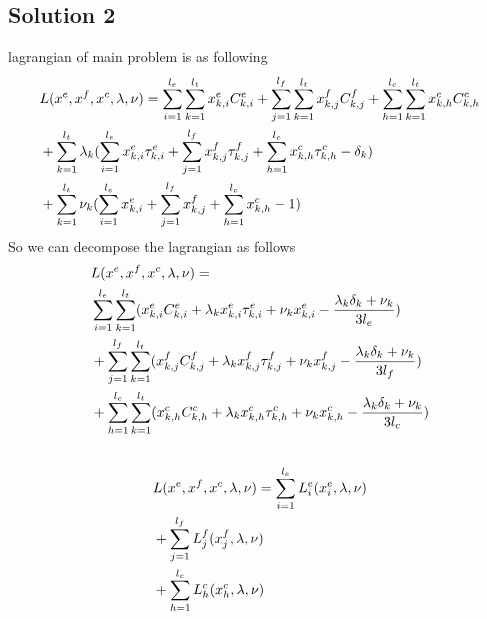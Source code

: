\documentclass[conference]{IEEEtran}
\begin{document}
    \subsection{Solution 2}
    lagrangian of main problem is as following
    \begin{subequations}
      \begin{align}
        &L(x^e,x^f,x^c,\lambda,\nu) = \sum_{i=1}^{l_e} \sum_{k=1}^{l_t} x_{k,i}^e C_{k,i}^e
        +\sum_{j=1}^{l_f} \sum_{k=1}^{l_t} x_{k,j}^f C_{k,j}^f
        +\sum_{h=1}^{l_c} \sum_{k=1}^{l_t} x_{k,h}^c C_{k,h}^c \\ \notag
        &+\sum_{k=1}^{l_t}\lambda_k(\sum_{i=1}^{l_e}x_{k,i}^e\tau_{k,i}^e
        +\sum_{j=1}^{l_f}x_{k,j}^f\tau_{k,j}^f
        +\sum_{h=1}^{l_c}x_{k,h}^c\tau_{k,h}^c
        -\delta_k) \\ \notag
        &+\sum_{k=1}^{l_t}\nu_k(\sum_{i=1}^{l_e}x_{k,i}^e+\sum_{j=1}^{l_f}x_{k,j}^f+\sum_{h=1}^{l_c}x_{k,h}^c-1)
      \end{align}
    \end{subequations}
    So we can decompose the lagrangian as follows
    \begin{subequations}
      \begin{align}
        &L(x^e,x^f,x^c,\lambda,\nu) = \\ \notag
        &\sum_{i=1}^{l_e} \sum_{k=1}^{l_t} (x_{k,i}^e C_{k,i}^e +\lambda_kx_{k,i}^e\tau_{k,i}^e +\nu_kx_{k,i}^e - \frac{\lambda_k\delta_k +\nu_k}{3l_e} ) \\ \notag
        &+\sum_{j=1}^{l_f} \sum_{k=1}^{l_t} (x_{k,j}^f C_{k,j}^f +\lambda_kx_{k,j}^f\tau_{k,j}^f +\nu_kx_{k,j}^f - \frac{\lambda_k\delta_k +\nu_k}{3l_f}) \\ \notag
        &+\sum_{h=1}^{l_c} \sum_{k=1}^{l_t} (x_{k,h}^c C_{k,h}^c +\lambda_kx_{k,h}^c\tau_{k,h}^c +\nu_kx_{k,h}^c - \frac{\lambda_k\delta_k +\nu_k}{3l_c}) \\ \notag
      \end{align}
    \end{subequations}
    \begin{subequations}
      \begin{align}
        &L(x^e,x^f,x^c,\lambda,\nu) = \sum_{i=1}^{l_e} L_{i}^e(x_{i}^e,\lambda,\nu) \\ \notag
        &+\sum_{j=1}^{l_f} L_{j}^f(x_{j}^f,\lambda,\nu) \\ \notag
        &+\sum_{h=1}^{l_c} L_{h}^c(x_{h}^c,\lambda,\nu) \\ \notag
      \end{align}
    \end{subequations}
\end{document}
